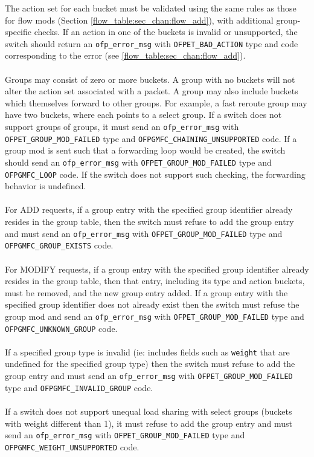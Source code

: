 \documentclass[10pt]{article}
\begin{document}
The action set for each bucket must be validated using the same rules as those for flow mods (Section \ref{flow_table:sec_chan:flow_add}), with additional group-specific checks. If an action in one of the buckets is invalid or unsupported, the switch should return an \verb|ofp_error_msg| with \verb|OFPET_BAD_ACTION| type and code corresponding to the error (see \ref{flow_table:sec_chan:flow_add}).
\\\\
Groups may consist of zero or more buckets. A group with no buckets will not alter the action set associated with a packet. A group may also include buckets which themselves forward to other groups. For example, a fast reroute group may have two buckets, where each points to a select group. If a switch does not support groups of groups, it must send an \verb|ofp_error_msg| with \verb|OFPET_GROUP_MOD_FAILED| type and \verb|OFPGMFC_CHAINING_UNSUPPORTED| code.  If a group mod is sent such that a forwarding loop would be created, the switch should send an \verb|ofp_error_msg| with \verb|OFPET_GROUP_MOD_FAILED| type and \verb|OFPGMFC_LOOP| code.  If the switch does not support such checking, the forwarding behavior is undefined.
\\\\
For ADD requests, if a group entry with the specified group identifier already resides in the group table, then the switch must refuse to add the group entry and must send an \verb|ofp_error_msg| with \verb|OFPET_GROUP_MOD_FAILED| type and \verb|OFPGMFC_GROUP_EXISTS| code.
\\\\
For MODIFY requests, if a group entry with the specified group identifier already resides in the group table, then that entry, including its type and action buckets, must be removed, and the new group entry added. If a group entry with the specified group identifier does not already exist then the switch must refuse the group mod and send an \verb|ofp_error_msg| with \verb|OFPET_GROUP_MOD_FAILED| type and \verb|OFPGMFC_UNKNOWN_GROUP| code.
\\\\
If a specified group type is invalid (ie: includes fields such as \verb|weight| that are undefined for the specified group type) then the switch must refuse to add the group entry and must send an \verb|ofp_error_msg| with \verb|OFPET_GROUP_MOD_FAILED| type and \verb|OFPGMFC_INVALID_GROUP| code.
\\\\
If a switch does not support unequal load sharing with select groups (buckets with weight different than 1), it must refuse to add the group entry and must send an \verb|ofp_error_msg| with \verb|OFPET_GROUP_MOD_FAILED| type and \verb|OFPGMFC_WEIGHT_UNSUPPORTED| code.
\end{document}

